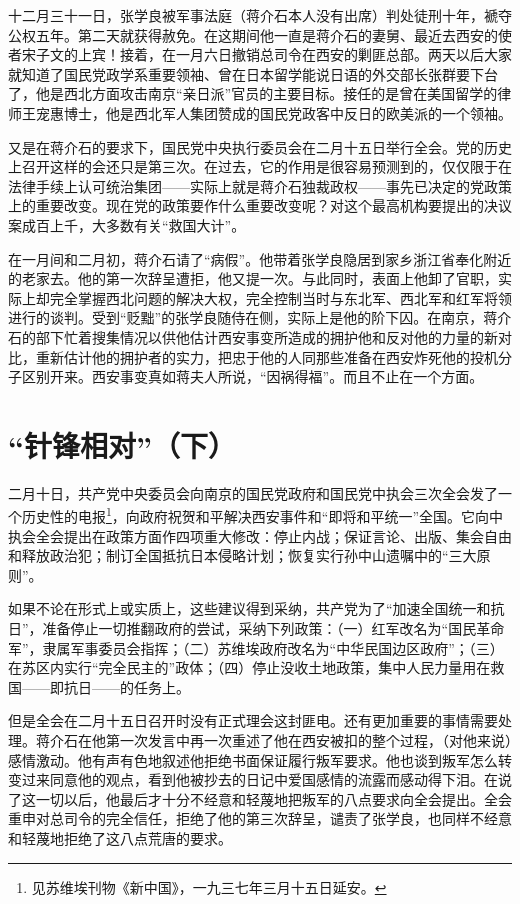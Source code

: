 \documentclass[10pt]{book}
\begin{document}
十二月三十一日，张学良被军事法庭（蒋介石本人没有出席）判处徒刑十年，褫夺公权五年。第二天就获得赦免。在这期间他一直是蒋介石的妻舅、最近去西安的使者宋子文的上宾！接着，在一月六日撤销总司令在西安的剿匪总部。两天以后大家就知道了国民党政学系重要领袖、曾在日本留学能说日语的外交部长张群要下台了，他是西北方面攻击南京“亲日派”官员的主要目标。接任的是曾在美国留学的律师王宠惠博士，他是西北军人集团赞成的国民党政客中反日的欧美派的一个领袖。

又是在蒋介石的要求下，国民党中央执行委员会在二月十五日举行全会。党的历史上召开这样的会还只是第三次。在过去，它的作用是很容易预测到的，仅仅限于在法律手续上认可统治集团——实际上就是蒋介石独裁政权——事先已决定的党政策上的重要改变。现在党的政策要作什么重要改变呢？对这个最高机构要提出的决议案成百上千，大多数有关“救国大计”。

在一月间和二月初，蒋介石请了“病假”。他带着张学良隐居到家乡浙江省奉化附近的老家去。他的第一次辞呈遭拒，他又提一次。与此同时，表面上他卸了官职，实际上却完全掌握西北问题的解决大权，完全控制当时与东北军、西北军和红军将领进行的谈判。受到“贬黜”的张学良随侍在侧，实际上是他的阶下囚。在南京，蒋介石的部下忙着搜集情况以供他估计西安事变所造成的拥护他和反对他的力量的新对比，重新估计他的拥护者的实力，把忠于他的人同那些准备在西安炸死他的投机分子区别开来。西安事变真如蒋夫人所说，“因祸得福”。而且不止在一个方面。

\section{“针锋相对”（下）}

二月十日，共产党中央委员会向南京的国民党政府和国民党中执会三次全会发了一个历史性的电报\footnote{见苏维埃刊物《新中国》，一九三七年三月十五日延安。}，向政府祝贺和平解决西安事件和“即将和平统一”全国。它向中执会全会提出在政策方面作四项重大修改：停止内战；保证言论、出版、集会自由和释放政治犯；制订全国抵抗日本侵略计划；恢复实行孙中山遗嘱中的“三大原则”。

如果不论在形式上或实质上，这些建议得到采纳，共产党为了“加速全国统一和抗日”，准备停止一切推翻政府的尝试，采纳下列政策：（一）红军改名为“国民革命军”，隶属军事委员会指挥；（二）苏维埃政府改名为“中华民国边区政府”；（三）在苏区内实行“完全民主的”政体；（四）停止没收土地政策，集中人民力量用在救国——即抗日——的任务上。

但是全会在二月十五日召开时没有正式理会这封匪电。还有更加重要的事情需要处理。蒋介石在他第一次发言中再一次重述了他在西安被扣的整个过程，（对他来说）感情激动。他有声有色地叙述他拒绝书面保证履行叛军要求。他也谈到叛军怎么转变过来同意他的观点，看到他被抄去的日记中爱国感情的流露而感动得下泪。在说了这一切以后，他最后才十分不经意和轻蔑地把叛军的八点要求向全会提出。全会重申对总司令的完全信任，拒绝了他的第三次辞呈，谴责了张学良，也同样不经意和轻蔑地拒绝了这八点荒唐的要求。
\end{document}
